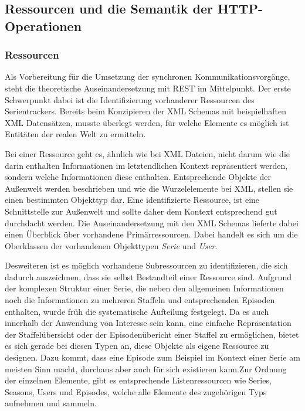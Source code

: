 \documentclass[a4paper]{article}
\begin{document}
\newpage

\subsection{Ressourcen und die Semantik der HTTP-Operationen}
\subsubsection{Ressourcen}

Als Vorbereitung für die Umsetzung der synchronen Kommunikationsvorgänge, steht die theoretische Auseinandersetzung mit REST im Mittelpunkt.
Der erste Schwerpunkt dabei ist die Identifizierung vorhanderer Ressourcen des Serientrackers. Bereits beim Konzipieren der XML Schemas mit beispielhaften XML Datensätzen, musste überlegt werden, für welche Elemente es möglich ist Entitäten der realen Welt zu ermitteln.

Bei einer Ressource geht es, ähnlich wie bei XML Dateien, nicht darum wie die darin enthalten Informationen im letztendlichen Kontext repräsentiert werden, sondern welche Informationen diese enthalten. Entsprechende Objekte der Außenwelt werden beschrieben und wie die Wurzelelemente bei XML, stellen sie einen bestimmten Objekttyp dar. Eine identifizierte Ressource, ist eine Schnittstelle zur Außenwelt und sollte daher dem Kontext entsprechend gut durchdacht werden.
Die Auseinandersetzung mit den XML Schemas lieferte dabei einen Überblick über vorhandene Primärressourcen. Dabei handelt es sich um die Oberklassen der vorhandenen Objekttypen \textit{Serie} und \textit{User}.

Desweiteren ist es möglich vorhandene Subressourcen zu identifizieren, die sich dadurch auszeichnen, dass sie selbst Bestandteil einer Ressource sind.
Aufgrund der komplexen Struktur einer Serie, die neben den allgemeinen Informationen noch die Informationen zu mehreren Staffeln und entsprechenden Episoden enthalten, wurde früh die systematische Aufteilung festgelegt.
Da es auch innerhalb der Anwendung von Interesse sein kann, eine einfache Repräsentation der Staffelübersicht oder der Episodenübericht einer Staffel zu ermöglichen, bietet es sich gerade bei diesen Typen an, diese Objekte als eigene Ressource zu designen. Dazu kommt, dass eine Episode zum Beispiel im Kontext einer Serie am meisten Sinn macht, durchaus aber auch für sich existieren kann.Zur Ordnung der einzelnen Elemente, gibt es entsprechende Listenressourcen wie Series, Seasons, Users und Episodes, welche alle Elemente des zugehörigen Typs aufnehmen und sammeln.\\
\end{document}
